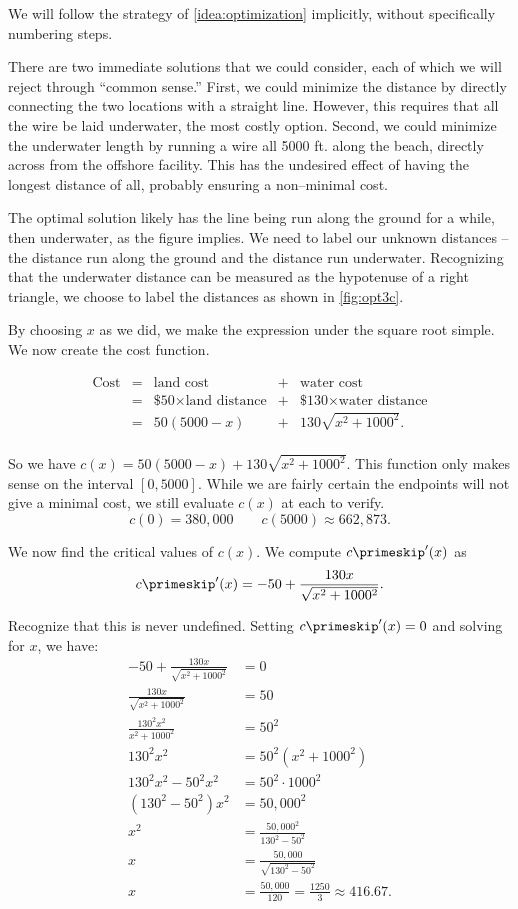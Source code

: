 {We will follow the strategy of \autoref{idea:optimization} implicitly, without specifically numbering steps.

There are two immediate solutions that we could consider, each of which we will reject through ``common sense.'' First, we could minimize the distance by directly connecting the two locations with a straight line. However, this requires that all the wire be laid underwater, the most costly option. Second, we could minimize the underwater length by running a wire all 5000 ft. along the beach, directly across from the offshore facility. This has the undesired effect of having the longest distance of all, probably ensuring a non--minimal cost.

The optimal solution likely has the line being run along the ground for a while, then underwater, as the figure implies. We need to label our unknown distances -- the distance run along the ground and the distance run underwater. Recognizing that the underwater distance can be measured as the hypotenuse of a right triangle, we choose to label the distances as shown in \autoref{fig:opt3c}.


By choosing $x$ as we did, we make the expression under the square root simple. We now create the cost function. 

\[
\begin{array}{ccccc}
	\text{Cost} &=&  \text{land cost} &+ & \text{water cost} \\
	&=& \text{\$50}\times \text{land distance} &+& \text{\$130}\times \text{water distance} \\
	&=& 50(5000-x) &+& 130\sqrt{x^2+1000^2}.\\
\end{array}
\]

So we have $c(x) = 50(5000-x)+ 130\sqrt{x^2+1000^2}$. This function only makes sense on the interval $[0,5000]$. While we are fairly certain the endpoints will not give a minimal cost, we still evaluate $c(x)$ at each to verify.
\[c(0) = 380,000 \quad\quad c(5000) \approx 662,873.\]

We now find the critical values of $c(x)$. We compute $c\primeskip'(x)$ as 
\[c\primeskip'(x) = -50+\frac{130x}{\sqrt{x^2+1000^2}}.\]

Recognize that this is never undefined. Setting $c\primeskip'(x)=0$ and solving for $x$, we have:
\begin{align*}
-50+\frac{130x}{\sqrt{x^2+1000^2}} &= 0 \\
\frac{130x}{\sqrt{x^2+1000^2}}  &= 50\\
\frac{130^2x^2}{x^2+1000^2} &= 50^2\\
130^2x^2 &= 50^2(x^2+1000^2) \\
130^2x^2-50^2x^2 &= 50^2\cdot1000^2\\
(130^2-50^2)x^2 &= 50,000^2\\
x^2 &= \frac{50,000^2}{130^2-50^2}\\
x &= \frac{50,000}{\sqrt{130^2-50^2}}\\
x & = \frac{50,000}{120} =\frac{1250}{3} %
\approx 416.67.
\end{align*}

}

